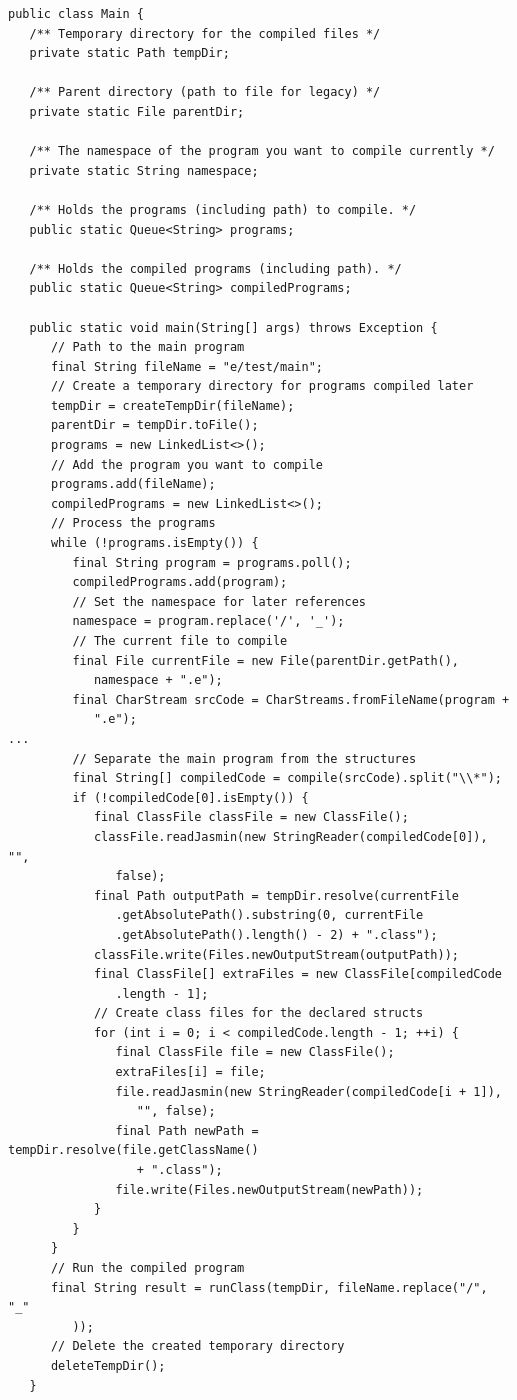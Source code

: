 \begin{lstlisting}[frame=htrbl, caption={Implementation of {\ttfamily Main.java}}, label={lst:main}, basicstyle=\footnotesize]
public class Main {
   /** Temporary directory for the compiled files */
   private static Path tempDir;

   /** Parent directory (path to file for legacy) */
   private static File parentDir;

   /** The namespace of the program you want to compile currently */
   private static String namespace;

   /** Holds the programs (including path) to compile. */
   public static Queue<String> programs;

   /** Holds the compiled programs (including path). */
   public static Queue<String> compiledPrograms;

   public static void main(String[] args) throws Exception {
      // Path to the main program
      final String fileName = "e/test/main";
      // Create a temporary directory for programs compiled later
      tempDir = createTempDir(fileName);
      parentDir = tempDir.toFile();
      programs = new LinkedList<>();
      // Add the program you want to compile
      programs.add(fileName);
      compiledPrograms = new LinkedList<>();
      // Process the programs
      while (!programs.isEmpty()) {
         final String program = programs.poll();
         compiledPrograms.add(program);
         // Set the namespace for later references
         namespace = program.replace('/', '_');
         // The current file to compile
         final File currentFile = new File(parentDir.getPath(), 
            namespace + ".e");
         final CharStream srcCode = CharStreams.fromFileName(program + 
            ".e");
...
         // Separate the main program from the structures
         final String[] compiledCode = compile(srcCode).split("\\*");
         if (!compiledCode[0].isEmpty()) {
            final ClassFile classFile = new ClassFile();
            classFile.readJasmin(new StringReader(compiledCode[0]), "", 
               false);
            final Path outputPath = tempDir.resolve(currentFile
               .getAbsolutePath().substring(0, currentFile
               .getAbsolutePath().length() - 2) + ".class");
            classFile.write(Files.newOutputStream(outputPath));
            final ClassFile[] extraFiles = new ClassFile[compiledCode
               .length - 1];
            // Create class files for the declared structs
            for (int i = 0; i < compiledCode.length - 1; ++i) {
               final ClassFile file = new ClassFile();
               extraFiles[i] = file;
               file.readJasmin(new StringReader(compiledCode[i + 1]), 
                  "", false);
               final Path newPath = tempDir.resolve(file.getClassName() 
                  + ".class");
               file.write(Files.newOutputStream(newPath));
            }
         }
      }
      // Run the compiled program
      final String result = runClass(tempDir, fileName.replace("/", "_"
         ));
      // Delete the created temporary directory
      deleteTempDir();
   }


\end{lstlisting}
